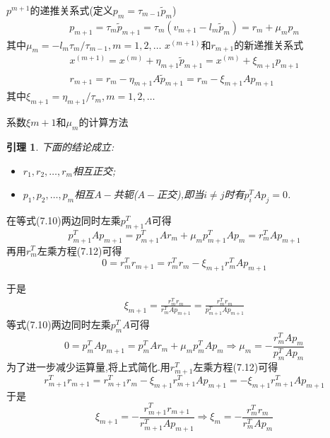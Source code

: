 \documentclass[notheorems,serif]{beamer}
\newcommand{\hei}[1]{{\HEI#1}}
\newtheorem{lemma}{\hei{引理}}
\begin{document}
\begin{frame}
{\color{blue}$p^{m+1}$的递推关系式}(定义$p_{m}=\tau_{m-1} \tilde{p}_{m}$)
\begin{align*}
	p_{m+1}=\tau_{m} \tilde{p}_{m+1}=\tau_{m}\left(v_{m+1}-l_{m} \tilde{p}_{m}\right)=r_{m}+\mu_{m} p_{m}
	\tag{7.10}
\end{align*}
其中$\mu_{m}=-l_{m} \tau_{m} / \tau_{m-1}, m=1,2, \ldots$
{\color{blue}$x^{(m+1)}$和$r_{m+1}$的新递推关系式}
\begin{align*}
	x^{(m+1)}=x^{(m)}+\eta_{m+1} \tilde{p}_{m+1}=x^{(m)}+\xi_{m+1} p_{m+1}\tag{7.11}\\
	r_{m+1}=r_{m}-\eta_{m+1} A \tilde{p}_{m+1}=r_{m}-\xi_{m+1} A p_{m+1}
	\tag{7.12}
\end{align*}
其中$\xi_{m+1}=\eta_{m+1} / \tau_{m}, m=1,2, \ldots$
\end{frame}

\begin{frame}


{\color{blue}系数$\xi m+1$和$\mu_{m}$的计算方法}
\begin{lemma}
下面的结论成立:
\begin{itemize}
	\item[(1)] $r_{1}, r_{2}, \ldots, r_{m}$相互正交;
	\item[(2)] $p_{1}, p_{2}, \dots, p_{m}$相互$A-$共轭($A-$正交),即当$i \neq j$时有$p_{i}^{T} A p_{j}=0$.
\end{itemize}
\end{lemma}
在等式(7.10)两边同时左乘$p_{m+1}^{T} A$可得
$$
p_{m+1}^{T} A p_{m+1}=p_{m+1}^{T} A r_{m}+\mu_{m} p_{m+1}^{T} A p_{m}=r_{m}^{T} A p_{m+1}
$$
再用$r_{m}^{T}$左乘方程(7.12)可得
$$
0=r_{m}^{T} r_{m+1}=r_{m}^{T} r_{m}-\xi_{m+1} r_{m}^{T} A p_{m+1}
$$
\end{frame}

\begin{frame}
于是
\begin{align*}
	\xi_{m+1}=\frac{r_{m}^{T} r_{m}}{r_{m}^{T} A p_{m+1}}=\frac{r_{m}^{T} r_{m}}{p_{m+1}^{T} A p_{m+1}}
	\tag{7.13}
\end{align*}
等式(7.10)两边同时左乘$p_{m}^{T} A$可得
$$
0=p_{m}^{T} A p_{m+1}=p_{m}^{T} A r_{m}+\mu_{m} p_{m}^{T} A p_{m} \Longrightarrow \mu_{m}=-\frac{r_{m}^{T} A p_{m}}{p_{m}^{T} A p_{m}}
$$
为了进一步减少运算量,将上式简化.用$r_{m+1}^{T}$左乘方程(7.12)可得
$$
r_{m+1}^{T} r_{m+1}=r_{m+1}^{T} r_{m}-\xi_{m+1} r_{m+1}^{T} A p_{m+1}=-\xi_{m+1} r_{m+1}^{T} A p_{m+1}
$$
于是
$$
\xi_{m+1}=-\frac{r_{m+1}^{T} r_{m+1}}{r_{m+1}^{T} A p_{m+1}} \Longrightarrow \xi_{m}=-\frac{r_{m}^{T} r_{m}}{r_{m}^{T} A p_{m}}
$$
\end{frame}
\end{document}
